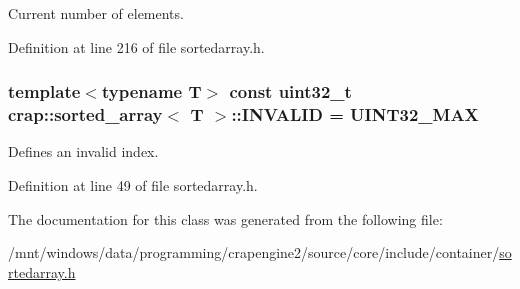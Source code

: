 Current number of elements. 



Definition at line 216 of file sortedarray.\+h.

\hypertarget{classcrap_1_1sorted__array_aa250f06b74b940be0c7e37e775e6765b}{}
\subsubsection[{I\+N\+V\+A\+L\+I\+D}]{\setlength{\rightskip}{0pt plus 5cm}template$<$typename T$>$ const uint32\+\_\+t {\bf crap\+::sorted\+\_\+array}$<$ T $>$\+::I\+N\+V\+A\+L\+I\+D = {\bf U\+I\+N\+T32\+\_\+\+M\+A\+X}\hspace{0.3cm}{\ttfamily [static]}}\label{classcrap_1_1sorted__array_aa250f06b74b940be0c7e37e775e6765b}


Defines an invalid index. 



Definition at line 49 of file sortedarray.\+h.



The documentation for this class was generated from the following file\+:\begin{DoxyCompactItemize}
\item 
/mnt/windows/data/programming/crapengine2/source/core/include/container/\hyperlink{sortedarray_8h}{sortedarray.\+h}\end{DoxyCompactItemize}

